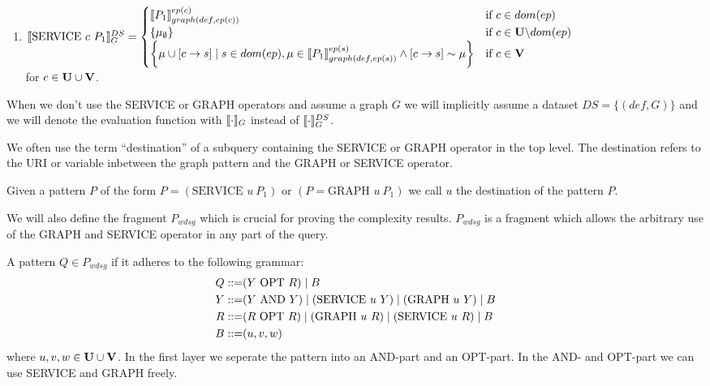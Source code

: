 \begin{definition}
{{\begin{enumerate}
					\item $\llbracket \mbox{SERVICE } c \ P_1 \rrbracket_G^{DS}  = 
						\begin{cases} 
							\llbracket P_1\rrbracket_{graph(def,ep(c))}^{ep(c)} &\mbox{if } c \in dom(ep)\\	
							\{ \mu_\emptyset\} & \mbox{if } c \in \mathbf{U} \backslash dom(ep)\\
							\bigg\{\mu \cup [c \rightarrow s ] \mid s \in dom(ep), \mu
								\in \llbracket P_1 \rrbracket^{ep(s)}_{graph(def,ep(s))} \land [ c \rightarrow s ] \sim \mu
							\bigg\}			   & \mbox{if } c \in \mathbf{V}
							\end{cases}$\\ 
							for $c \in \mathbf{U} \cup \mathbf{V}$.
					\end{enumerate}
				}
			}
		\end{definition}

		When we don't use the SERVICE or GRAPH operators and assume a graph $G$
		we will implicitly assume a dataset $DS = \{(def,G)\}$ and
		we will denote the evaluation function with $\llbracket \cdot \rrbracket_G$ instead
		of $\llbracket \cdot \rrbracket^{DS}_G$.

		We often use the term ``destination'' of a subquery containing the SERVICE or
		GRAPH operator in the top level.
		The destination refers to the URI or variable inbetween the graph
		pattern and the GRAPH or SERVICE operator.

		\begin{definition}
			Given a pattern $P$ of the form $P = (\mbox{SERVICE } u \ P_1)$ or
			$(P	= \mbox{GRAPH } u \ P_1)$ we call $u$ the
			destination of the pattern $P$.
		\end{definition}

		We will also define the fragment $P_{wdsg}$ which is crucial for proving the
		complexity results. $P_{wdsg}$ is a fragment which allows the arbitrary use of
		the GRAPH and SERVICE operator in any part of the query.
		\begin{definition}[$P_{wdsg}$]
			A pattern $Q \in P_{wdsg}$ if it adheres to the following grammar:
			\begin{align*}
				Q::= &  (Y \mbox{ OPT } R)  \mid B \\
				Y::= & (Y \mbox{ AND } Y) \mid (\mbox{SERVICE } u \ Y) \mid (\mbox{GRAPH } u \
				Y) \mid  B\\
				R::= &(R \mbox{ OPT } R) \mid (\mbox{GRAPH } u \ R) \mid (\mbox{SERVICE } u \ R) \mid B  \\
				B::= &(u,v,w)
			\end{align*}
			where	$u,v,w \in \mathbf{U} \cup \mathbf{V}$. In the first layer we seperate the pattern
			into an AND-part and an OPT-part. In the AND- and OPT-part we can use
			SERVICE and GRAPH freely.
		\end{definition}

